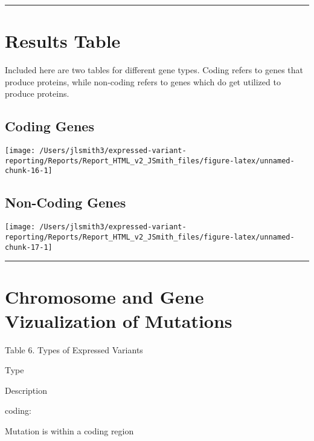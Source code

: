 \documentclass[
]{article}
\begin{document}
\begin{center}\rule{0.5\linewidth}{0.5pt}\end{center}

\hypertarget{results-table}{%
\section{Results Table}\label{results-table}}

Included here are two tables for different gene types. Coding refers to
genes that produce proteins, while non-coding refers to genes which do
get utilized to produce proteins.

\hypertarget{coding-genes}{%
\subsection{Coding Genes}\label{coding-genes}}

\begin{center}\texttt{[image: /Users/jlsmith3/expressed-variant-reporting/Reports/Report\_HTML\_v2\_JSmith\_files/figure-latex/unnamed-chunk-16-1]} \end{center}

\hypertarget{non-coding-genes}{%
\subsection{Non-Coding Genes}\label{non-coding-genes}}

\begin{center}\texttt{[image: /Users/jlsmith3/expressed-variant-reporting/Reports/Report\_HTML\_v2\_JSmith\_files/figure-latex/unnamed-chunk-17-1]} \end{center}

\begin{center}\rule{0.5\linewidth}{0.5pt}\end{center}

\hypertarget{chromosome-and-gene-vizualization-of-mutations}{%
\section{Chromosome and Gene Vizualization of
Mutations}\label{chromosome-and-gene-vizualization-of-mutations}}

Table 6. Types of Expressed Variants

Type

Description

coding:

Mutation is within a coding region
\end{document}
